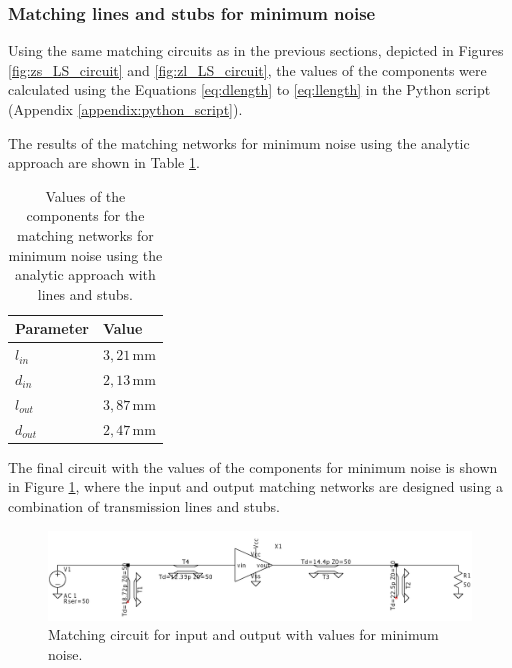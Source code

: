 \subsubsection{Matching lines and stubs for minimum noise}

Using the same matching circuits as in the previous sections, depicted in Figures \ref{fig:zs_LS_circuit} and \ref{fig:zl_LS_circuit}, the values of the components were calculated using the Equations \ref{eq:dlength} to \ref{eq:llength} in the Python script (Appendix \ref{appendix:python_script}).

The results of the matching networks for minimum noise using the analytic approach are shown in Table \ref{tab:MatchingValuesLines-noise}.
\begin{table}[H]
    \centering
    \caption{Values of the components for the matching networks for minimum noise using the analytic approach with lines and stubs.}
    \begin{tabularx}{\textwidth}{>{\centering\arraybackslash}X >{\centering\arraybackslash}X}
        \toprule
        \textbf{Parameter} & \textbf{Value} \\
        \midrule
        $l_{in}$     & $3,21\,\si{\milli\meter}$ \\
        \midrule
        $d_{in}$   & $2,13\,\si{\milli\meter}$ \\
        \midrule
        $l_{out}$     & $3,87\,\si{\milli\meter}$\\
        \midrule
        $d_{out}$   & $2,47\,\si{\milli\meter}$\\
        \bottomrule
    \end{tabularx}
    \label{tab:MatchingValuesLines-noise}
\end{table}

The final circuit with the values of the components for minimum noise is shown in Figure \ref{fig:MatchingCircuit-line-noise}, where the input and output matching networks are designed using a combination of transmission lines and stubs.

\begin{figure}[H]
    \centering
    \includegraphics[width=1\textwidth]{Images/LS-noise-matching-circuit.png}
    \caption{Matching circuit for input and output with values for minimum noise.}
    \label{fig:MatchingCircuit-line-noise}
\end{figure}


